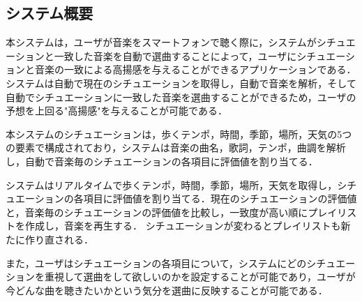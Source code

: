 \subsection{システム概要}
\par
本システムは，ユーザが音楽をスマートフォンで聴く際に，システムがシチュエーションと一致した音楽を自動で選曲することによって，ユーザにシチュエーションと音楽の一致による高揚感を与えることができるアプリケーションである．システムは自動で現在のシチュエーションを取得し，自動で音楽を解析，そして自動でシチュエーションに一致した音楽を選曲することができるため，ユーザの予想を上回る"高揚感"を与えることが可能である．
\par
本システムのシチュエーションは，歩くテンポ，時間，季節，場所，天気の5つの要素で構成されており，システムは音楽の曲名，歌詞，テンポ，曲調を解析し，自動で音楽毎のシチュエーションの各項目に評価値を割り当てる．
\par
システムはリアルタイムで歩くテンポ，時間，季節，場所，天気を取得し，シチュエーションの各項目に評価値を割り当てる．現在のシチュエーションの評価値と，音楽毎のシチュエーションの評価値を比較し，一致度が高い順にプレイリストを作成し，音楽を再生する．
シチュエーションが変わるとプレイリストも新たに作り直される．
\par
また，ユーザはシチュエーションの各項目について，システムにどのシチュエーションを重視して選曲をして欲しいのかを設定することが可能であり，ユーザが今どんな曲を聴きたいかという気分を選曲に反映することが可能である．
